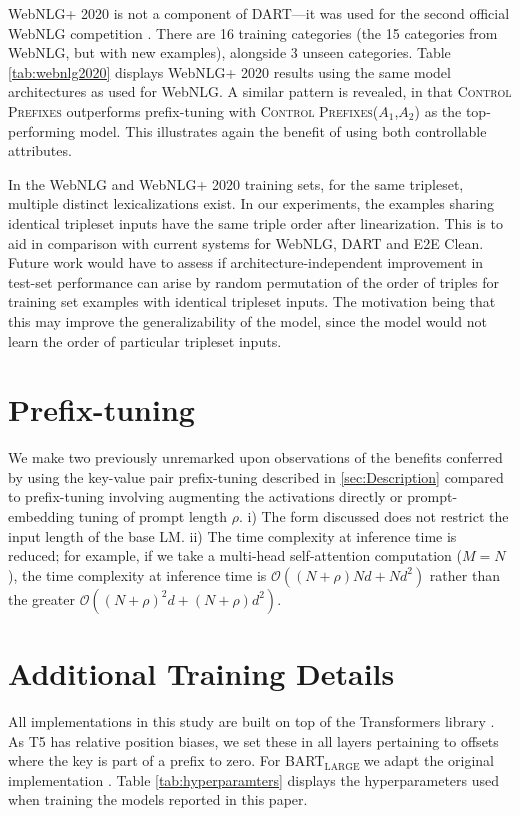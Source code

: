\documentclass[11pt]{article}
\newcommand{\control}{\textsc{Control Prefixes}\xspace}
\newcommand{\bartl}{BART$_{\text {LARGE }}$}
\begin{document}
WebNLG+ 2020  is not a component of DART—it was used for the second
official WebNLG competition \citep{web2020}. There are 16 training categories
(the 15 categories from WebNLG, but with new examples), alongside 3 unseen
categories. Table \ref{tab:webnlg2020} displays WebNLG+ 2020 results using the same model architectures as used for WebNLG. A similar pattern is revealed, in that \control outperforms prefix-tuning with \control ($A_1$,$A_2$) as the top-performing model. This illustrates again the benefit of using both controllable attributes.

In the WebNLG and WebNLG+ 2020 training sets, for the same tripleset, multiple distinct lexicalizations exist. In our experiments, the examples sharing identical tripleset inputs have the same triple order after linearization. This is to aid in comparison with current systems for WebNLG, DART and E2E Clean. Future work would have to assess if architecture-independent improvement in test-set performance can arise by random permutation of the order of triples for training set examples with identical tripleset inputs. The motivation being that this may improve the generalizability of the model, since the model would not learn the order of particular tripleset inputs.



\FloatBarrier


\section{Prefix-tuning}
\label{app:prefix}
We make two previously unremarked upon observations of the benefits conferred by using the key-value pair prefix-tuning described in \cref{sec:Description} compared to prefix-tuning involving augmenting the activations directly \citep{lora} or prompt-embedding tuning of prompt length $\rho$. i) The form discussed does not restrict the input length of the base LM. 
ii) The time complexity at inference time is reduced; for example, if we take a multi-head self-attention computation ($M=N$), the time complexity at inference time is $\mathcal{O}((N+\rho) N d + Nd^{2})$ rather than the greater $\mathcal{O}((N+\rho)^{2}d + (N+\rho)d^{2})$.


\section{Additional Training Details}
\label{app:hyper}



All implementations in this study are built on top of the Transformers library \citep{wolf}. As T5 has relative position biases, we set these in all layers pertaining to offsets where the key is part of a prefix to zero. 
For \bartl we adapt the original implementation \citep{lisa}.
Table \ref{tab:hyperparamters} displays the hyperparameters used when training the models reported in this paper.
\end{document}
